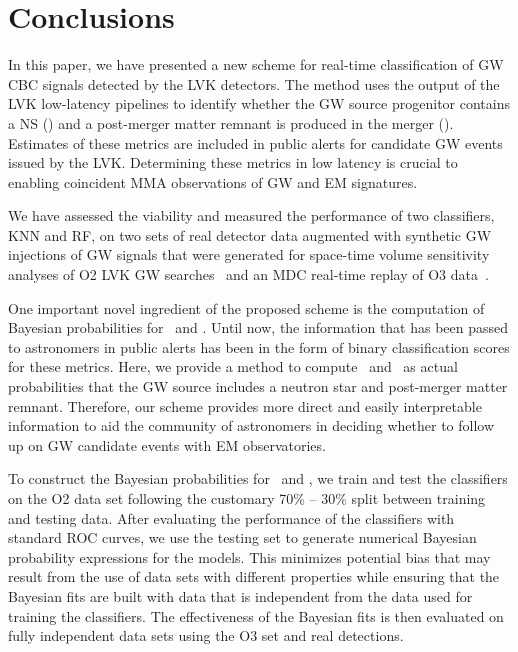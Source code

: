 \section{Conclusions\label{conclusions}}

In this paper, we have presented a new scheme for real-time classification of \ac{GW} \ac{CBC} signals detected by the \ac{LVK} detectors. The method uses the output of the \ac{LVK}
low-latency pipelines to identify whether the GW source progenitor contains a \ac{NS} (\hasns) and a post-merger matter remnant is produced in the merger (\hasrem). Estimates of these
metrics are included in public alerts for candidate \ac{GW} events issued by the \ac{LVK}. Determining these metrics in low latency is crucial to enabling coincident \ac{MMA} observations
of GW and \ac{EM} signatures.

We have assessed the viability and measured the performance of two classifiers, \ac{KNN} and \ac{RF}, on two sets of real detector data augmented with synthetic GW injections of GW
signals that were generated for space-time volume sensitivity analyses of \ac{O2} \ac{LVK} \ac{GW} searches~\cite{Chatterjee:2019avs} and an \ac{MDC} real-time replay of \ac{O3}
data~\cite{Chaudhary:2023vec}. 


One important novel ingredient of the proposed scheme is the computation of Bayesian probabilities for \hasns\ and \hasrem. Until now, the information that has been passed to astronomers
in public alerts has been in the form of binary classification scores for these metrics. Here, we provide a method to compute \hasns\ and \hasrem\ as actual probabilities that the \ac{GW}
source includes a neutron star and post-merger matter remnant. Therefore, our scheme provides more direct and easily interpretable information to aid the community of astronomers in
deciding whether to follow up on \ac{GW} candidate events with \ac{EM} observatories.

To construct the Bayesian probabilities for \hasns\ and \hasrem, we train and test the classifiers on the \ac{O2} data set following the customary 70\% -- 30\% split between training and
testing data. After evaluating the performance of the classifiers with standard \ac{ROC} curves, we use the testing set to generate numerical Bayesian probability expressions for the
models. This minimizes potential bias that may result from the use of data sets with different properties while ensuring that the Bayesian fits are built with data that is independent
from the data used for training the classifiers. The effectiveness of the Bayesian fits is then evaluated on fully independent data sets using the \ac{O3} set and real detections. 

